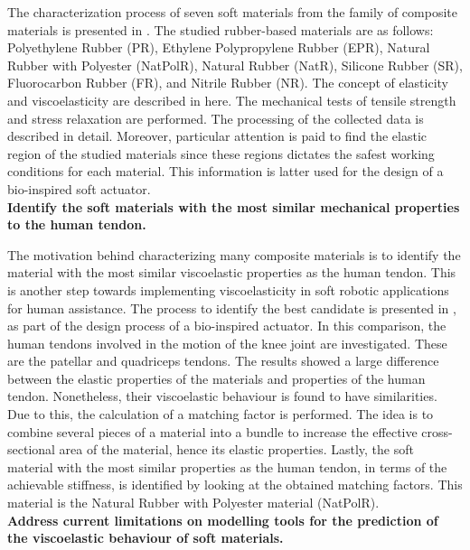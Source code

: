 The characterization process of seven soft materials from the family of composite materials is presented in . The studied rubber-based materials are as follows: Polyethylene Rubber (PR), Ethylene Polypropylene Rubber (EPR), Natural Rubber with Polyester (NatPolR), Natural Rubber (NatR), Silicone Rubber (SR), Fluorocarbon Rubber (FR), and Nitrile Rubber (NR). The concept of elasticity and viscoelasticity are described in here. The mechanical tests of tensile strength and stress relaxation are performed. The processing of the collected data is described in detail. Moreover, particular attention is paid to find the elastic region of the studied materials since these regions dictates the safest working conditions for each material. This information is latter used for the design of a bio-inspired soft actuator.
\\[1em]
\noindent \textbf{\large{ Identify the soft materials with the most similar mechanical properties to the human tendon.}}

The motivation behind characterizing many composite materials is to identify the material with the most similar viscoelastic properties as the human tendon. This is another step towards implementing viscoelasticity in soft robotic applications for human assistance. The process to identify the best candidate is presented in , as part of the design process of a bio-inspired actuator. In this comparison, the human tendons involved in the motion of the knee joint are investigated. These are the patellar and quadriceps tendons. The results showed a large difference between the elastic properties of the materials and properties of the human tendon. Nonetheless, their viscoelastic behaviour is found to have similarities. Due to this, the calculation of a matching factor is performed. The idea is to combine several pieces of a material into a bundle to increase the effective cross-sectional area of the material, hence its elastic properties. Lastly, the soft material with the most similar properties as the human tendon, in terms of the achievable stiffness, is identified by looking at the obtained matching factors. This material is the Natural Rubber with Polyester material (NatPolR).
\\[1em]
\noindent \textbf{\large{ Address current limitations on modelling tools for the prediction of the viscoelastic behaviour of soft materials. }}

